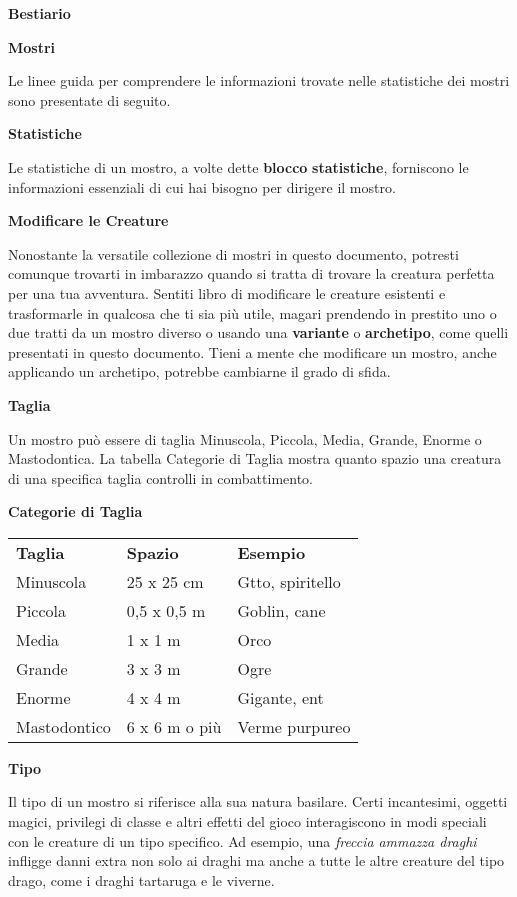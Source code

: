 \begin{multicols}{2}
	
\textbf{Bestiario}

\textbf{Mostri}

Le linee guida per comprendere le informazioni trovate nelle statistiche
dei mostri sono presentate di seguito.

\textbf{Statistiche}

Le statistiche di un mostro, a volte dette \textbf{blocco}
\textbf{statistiche}, forniscono le informazioni essenziali di cui hai
bisogno per dirigere il mostro.

\textbf{Modificare le Creature}

Nonostante la versatile collezione di mostri in questo documento,
potresti comunque trovarti in imbarazzo quando si tratta di trovare la
creatura perfetta per una tua avventura. Sentiti libro di modificare le
creature esistenti e trasformarle in qualcosa che ti sia più utile,
magari prendendo in prestito uno o due tratti da un mostro diverso o
usando una \textbf{variante} o \textbf{archetipo}, come quelli
presentati in questo documento. Tieni a mente che modificare un mostro,
anche applicando un archetipo, potrebbe cambiarne il grado di sfida.

\textbf{Taglia}

Un mostro può essere di taglia Minuscola, Piccola, Media, Grande, Enorme
o Mastodontica. La tabella Categorie di Taglia mostra quanto spazio una
creatura di una specifica taglia controlli in combattimento.

\textbf{Categorie di Taglia}

\begin{tabular}{lll}
\toprule
\textbf{Taglia}& \textbf{Spazio} & \textbf{Esempio}\\
Minuscola & 25 x 25 cm& Gtto, spiritello\\
Piccola & 0,5 x 0,5 m & Goblin, cane\\
Media & 1 x 1 m & Orco\\
Grande & 3 x 3 m& Ogre\\
Enorme & 4 x 4 m & Gigante, ent\\
Mastodontico & 6 x 6 m o più&Verme purpureo\\
\end{tabular}

\textbf{Tipo}

Il tipo di un mostro si riferisce alla sua natura basilare. Certi
incantesimi, oggetti magici, privilegi di classe e altri effetti del
gioco interagiscono in modi speciali con le creature di un tipo
specifico. Ad esempio, una \emph{freccia} \emph{ammazza draghi} infligge
danni extra non solo ai draghi ma anche a tutte le altre creature del
tipo drago, come i draghi tartaruga e le viverne.


\end{multicols}
